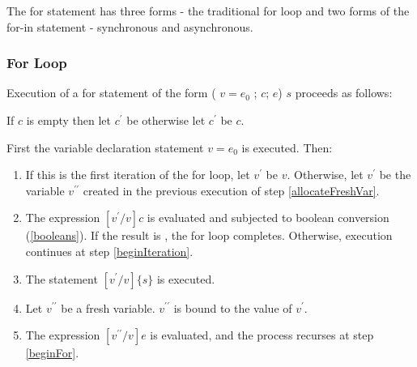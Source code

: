 \documentclass{article}
\newcommand{\code}[1]{{\sf #1}}
\begin{document}
\LMHash{}
 The for statement has three forms - the traditional for loop and two forms of the for-in statement - synchronous and asynchronous.

\subsubsection{For Loop}


\LMHash{}
Execution of a for statement of the form   \code{ \FOR{} (\VAR{} $v = e_0$ ; $c$; $e$) $s$} proceeds as follows:

\LMHash{}
If $c$ is empty then let $c^\prime$ be \TRUE{} otherwise let  $c^\prime$ be $c$.

\LMHash{}
First the variable declaration statement \VAR{} $v = e_0$ is executed. Then:
\begin{enumerate}
\item
\label{beginFor}
If this is the first iteration of the for loop, let $v^\prime$ be $v$. Otherwise,  let $v^\prime$ be the variable $v^{\prime\prime}$ created in the previous execution of step \ref{allocateFreshVar}.
\item
The expression $[v^\prime/v]c$ is evaluated and subjected to boolean conversion (\ref{booleans}). If the result is \FALSE{}, the for loop completes. Otherwise, execution continues at step
\ref{beginIteration}.
\item
\label{beginIteration}
The statement $[v^\prime/v]\{s\}$ is executed.
\item
\label{allocateFreshVar}
Let $v^{\prime\prime}$ be a fresh variable.  $v^{\prime\prime}$ is bound to the value of $v^\prime$.
\item
The expression $[v^{\prime\prime}/v]e$ is evaluated, and the process recurses at step
  \ref{beginFor}.
\end{enumerate}

\end{document}

